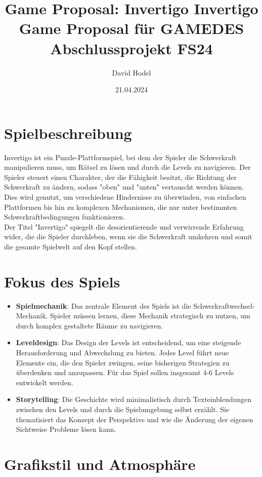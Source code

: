 \documentclass{article}
\title{Game Proposal: Invertigo}
\title{%
Invertigo \\
\large Game Proposal für GAMEDES \\
  Abschlussprojekt FS24}
\author{David Hodel}
\date{21.04.2024}
\begin{document}
\maketitle
\newpage

\section{Spielbeschreibung}
Invertigo ist ein Puzzle-Plattformspiel, bei dem der Spieler die Schwerkraft manipulieren muss,
um Rätsel zu lösen und durch die Levels zu navigieren. Der Spieler steuert einen Charakter,
der die Fähigkeit besitzt, die Richtung der Schwerkraft zu ändern, sodass "oben" und "unten" vertauscht werden können.
Dies wird genutzt, um verschiedene Hindernisse zu überwinden, von einfachen Plattformen bis hin zu komplexen Mechanismen,
die nur unter bestimmten Schwerkraftbedingungen funktionieren.
\\
Der Titel "Invertigo" spiegelt die desorientierende und verwirrende Erfahrung wider, die die Spieler durchleben,
wenn sie die Schwerkraft umkehren und somit die gesamte Spielwelt auf den Kopf stellen.

\section{Fokus des Spiels}

\begin{itemize}
    \item \textbf{Spielmechanik}: Das zentrale Element des Spiels ist die Schwerkraftwechsel-Mechanik.
    Spieler müssen lernen, diese Mechanik strategisch zu nutzen, um durch komplex gestaltete Räume zu navigieren.
    \item \textbf{Leveldesign}: Das Design der Levels ist entscheidend, um eine steigende Herausforderung und Abwechslung zu bieten.
    Jedes Level führt neue Elemente ein, die den Spieler zwingen, seine bisherigen Strategien zu überdenken und anzupassen.
    Für das Spiel sollen insgesamt 4-6 Levels entwickelt werden.
    \item \textbf{Storytelling}: Die Geschichte wird minimalistisch durch Texteinblendungen zwischen den Levels und durch die Spielumgebung selbst erzählt.
    Sie thematisiert das Konzept der Perspektive und wie die Änderung der eigenen Sichtweise Probleme lösen kann.
\end{itemize}

\section{Grafikstil und Atmosphäre}
\end{document}
